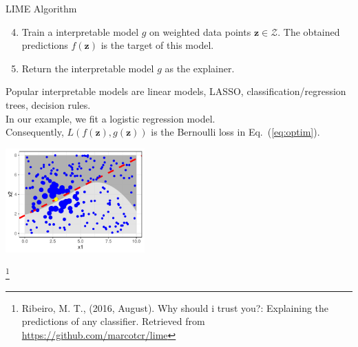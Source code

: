 \documentclass[11pt,compress,t,notes=noshow, xcolor=table]{beamer}
\newcommand{\zv}{\mathbf{z}}
\newcommand{\Zspace}{\mathcal{Z}}
\begin{document}
\begin{vbframe}{LIME Algorithm}
		\framebreak
		\begin{enumerate}
			\setcounter{enumi}{3}
		\item Train a interpretable model $g$ on weighted data points $\zv \in \Zspace$. The obtained predictions $f(\zv)$ is the target of this model.
		\item Return the interpretable model $g$ as the explainer. \\[0.3cm]
			\end{enumerate}
		Popular interpretable models are linear models, LASSO, classification/regression trees, decision rules. \\
		In our example, we fit a logistic regression model. \\Consequently, $L(f(\zv), g(\zv))$  is the Bernoulli loss in Eq.~(\ref{eq:optim}). 
		\begin{center}
			\includegraphics[width=0.4\textwidth]{figure/lime5}
		\end{center}
		\footnote[frame]{Ribeiro, M. T., (2016, August). Why should i trust you?: Explaining the predictions of any classifier. Retrieved from \url{https://github.com/marcotcr/lime}}
\end{vbframe}
\end{document}
